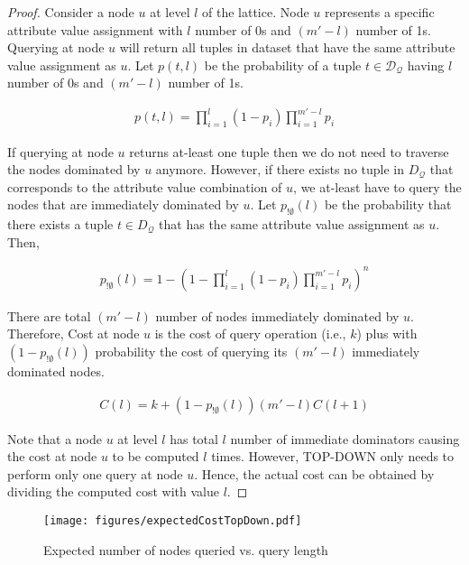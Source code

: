 \begin{proof}
Consider a node $u$ at level $l$ of the lattice. Node $u$ represents a specific attribute value assignment with $l$ number of 0s and $(m' - l)$ number of 1s. Querying at node $u$ will return all tuples in dataset that have the same attribute value assignment as $u$. Let $p(t, l)$ be the probability of a tuple $t \in \mathcal{D_Q}$ having $l$ number of 0s and $(m' - l)$ number of 1s.

\begin{align}
p(t, l) = \prod\nolimits_{i=1}^{l}(1-p_i)\prod\nolimits_{i=1}^{m'-l}p_i
\end{align}

If querying at node $u$ returns at-least one tuple then we do not need to traverse the nodes dominated by $u$ anymore. However, if there exists no tuple in $D_{\mathcal{Q}}$ that corresponds to the attribute value combination of $u$, we at-least have to query the nodes that are immediately dominated by $u$. Let $p_{!\emptyset}(l)$ be the probability that there exists a tuple $t \in D_{\mathcal{Q}}$ that has the same attribute value assignment as $u$. Then,

\begin{align}
p_{!\emptyset}(l) = 1 - (1 - \prod_{i=1}^{l}(1-p_i)\prod_{i=1}^{m'-l}p_i ) ^ n
\end{align}

There are total $(m' - l)$ number of nodes immediately dominated by $u$. Therefore, Cost at node $u$ is the cost of query operation (i.e., $k$) plus with $(1 - p_{!\emptyset}(l))$ probability the cost of querying its $(m'-l)$ immediately dominated nodes.

\begin{align}
C(l) = k +  (1-p_{!\emptyset}(l)) (m' - l) C(l+1)
\end{align}

Note that a node $u$ at level $l$ has total $l$ number of immediate dominators causing the cost at node $u$ to be computed $l$ times. However, TOP-DOWN only needs to perform only one query at node $u$. Hence, the actual cost can be obtained by dividing the computed cost with value $l$.
\end{proof}


\begin{figure}[!h]
  \centering
  \texttt{[image: figures/expectedCostTopDown.pdf]}
  \vspace{-4mm}\caption{Expected number of nodes queried vs. query length}
  \label{fig:performanceTopDown}
\end{figure}


